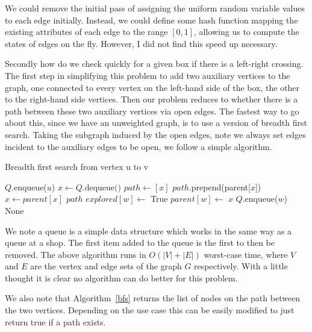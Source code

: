 \documentclass[a4paper,11pt]{article}
\theoremstyle{definition}
\begin{document}
We could remove the initial pass of assigning the uniform random variable values to each edge initially. Instead, we could define some hash function mapping the existing attributes of each edge to the range $[0,1]$, allowing us to compute the states of edges on the fly. However, I did not find this speed up necessary.

Secondly how do we check quickly for a given box if there is a left-right crossing. The first step in simplifying this problem to add two auxiliary vertices to the graph, one connected to every vertex on the left-hand side of the box, the other to the right-hand side vertices. Then our problem reduces to whether there is a path between these two auxiliary vertices via open edges.
The fastest way to go about this, since we have an unweighted graph, is to use a version of breadth first search. Taking the subgraph induced by the open edges, note we always set edges incident to the auxiliary edges to be open, we follow a simple algorithm.
\begin{algorithm}
	\caption{Breadth first search from vertex u to v}\label{bfs}
	\begin{algorithmic}[1]
	\State $Q$.enqueue($u$)
		\State $x \gets Q\text{.dequeue()}$
		 
			\State $path \gets [x]$
				\State $path$.prepend(parent[$x$])
				\State $x \gets parent[x]$
			\EndWhile
			\State
			\Return $path$
		\EndIf
				\State $explored[w] \gets$ True
				\State $parent[w] \gets$ $x$
				\State $Q$.enqueue($w$)
			\EndIf
		\EndFor
	\EndWhile
	 \Return None
	\EndIf
	\EndProcedure
	\end{algorithmic}
	\end{algorithm}

We note a queue is a simple data structure which works in the same way as a queue at a shop. The first item added to the queue is the first to then be removed.
The above algorithm runs in $O(|V|+|E|)$ worst-case time, where $V$ and $E$ are the vertex and edge sets of the graph $G$ respectively. With a little thought it is clear no algorithm can do better for this problem. 

We also note that Algorithm~\ref*{bfs} returns the list of nodes on the path between the two vertices. Depending on the use case this can be easily modified to just return true if a path exists. 
\end{document}
